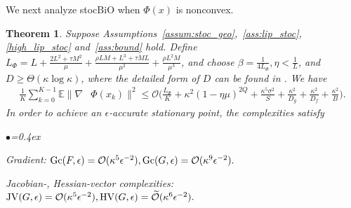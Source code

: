 \documentclass{osudissert96}
\newtheorem{theorem}{Theorem}
\begin{document}
We next analyze stocBiO when $\Phi(x)$ is nonconvex.
\begin{theorem}\label{th:nonconvex}
Suppose Assumptions~\ref{assum:stoc_geo},~\ref{ass:lip_stoc}, \ref{high_lip_stoc} and~\ref{ass:bound} hold. Define 
$L_\Phi = L + \frac{2L^2+\tau M^2}{\mu} + \frac{\rho L M+L^3+\tau M L}{\mu^2} + \frac{\rho L^2 M}{\mu^3}$, and choose $\beta=\frac{1}{4L_\Phi}, \eta<\frac{1}{L}$, and 
 $D\geq\Theta(\kappa\log \kappa)$, where the detailed form of $D$ can be found in .  %
We have
\begin{align}\label{eq:main_nonconvex}
\frac{1}{K}\sum_{k=0}^{K-1}\mathbb{E}\|\nabla&\Phi(x_k)\|^2 \leq  \mathcal{O}\Big( \frac{L_\Phi}{K}+  \kappa^2(1-\eta \mu)^{2Q}+\frac{\kappa^5\sigma^2}{S}+ \frac{\kappa^2}{D_g} +\frac{\kappa^2}{D_f}+ \frac{\kappa^2}{B}\Big).
\end{align}
In order to achieve an $\epsilon$-accurate stationary point, the complexities satisfy 
\begin{list}{$\bullet$}{\topsep=0.4ex \leftmargin=0.15in  \itemsep =0.01in}
\item Gradient: {\small$\mbox{\normalfont Gc}(F,\epsilon)=\mathcal{O}(\kappa^5\epsilon^{-2}), \mbox{\normalfont Gc}(G,\epsilon)=\mathcal{O}(\kappa^9\epsilon^{-2}).$}
\item Jacobian-, Hessian-vector complexities: {\small$\mbox{\normalfont JV}(G,\epsilon)=\mathcal{O}(\kappa^5\epsilon^{-2}), \mbox{\normalfont HV}(G,\epsilon)=\mathcal{\widetilde O}(\kappa^6\epsilon^{-2}).$}
\end{list}
\end{theorem}
\end{document}
